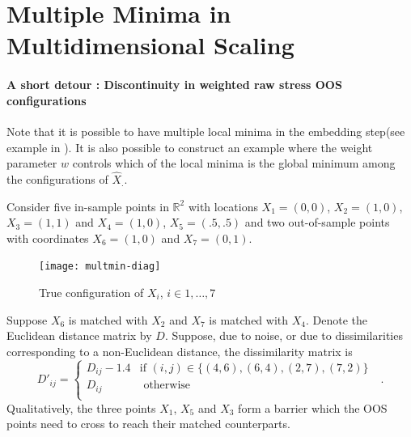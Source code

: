 \documentclass[12pt,oneside,final]{thesis}\usepackage[]{graphicx}\usepackage[]{color}
\begin{document}
\chapter{Multiple Minima in  Multidimensional Scaling }
\label{sec:MultMinima}


\subsubsection{ A short detour : Discontinuity in weighted raw stress OOS configurations\label{subsubsec:Discontinuity}}

Note that it is possible to have multiple local minima in the embedding step(see example in \cite{TrossetLocalMin}). It is also possible to construct an example  where the weight parameter $w$ controls which of the local minima is the global minimum among the configurations of $\hat{X}_{.}$.


Consider five in-sample points in $\mathbb{R}^2$ with locations $X_1=(0,0)$, $X_2=(1,0)$, $X_3=(1,1)$
and $X_4=(1,0)$, $X_5=(.5,.5)$ and two out-of-sample  points with coordinates $X_6=(1,0)$ and $X_7=(0,1)$.
\begin{figure}
\centering
\texttt{[image: multmin-diag]}
\caption{True configuration of $X_{i}$, $i \in {1,\ldots,7}$}
\label{original-config}
\end{figure} 
Suppose $X_6$ is matched with $X_2$ and $X_7$ is matched with $X_4$. 
Denote the Euclidean distance matrix by $D$. 
Suppose, due to noise, or due to dissimilarities corresponding to a non-Euclidean distance, 
the dissimilarity matrix is $$D'_{ij}=\begin{cases}
D_{ij}-1.4 & \textrm{if  $(i,j) \in \{(4,6),(6,4),(2,7),(7,2)   \}$ }\\
D_{ij}  & \textrm{ otherwise}\\
\end{cases}.$$ 
Qualitatively, the three points $X_1$, $X_5$ and $X_3$ form a barrier which the OOS points need to cross  to reach their matched counterparts. 
\end{document}
